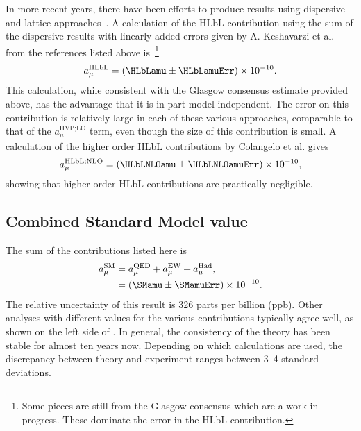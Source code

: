 In more recent years, there have been efforts to produce results using dispersive~\cite{PhysRevLett.121.112002,PhysRevD.95.054026,Hoferichter:2018kwz,Colangelo:2015ama,Colangelo:2017fiz,Colangelo:2017another,Colangelo:2019uex,Colangelo:2019lpu} and lattice approaches~\cite{Blum:2019ugy,Asmussen:2019act}. A calculation of the HLbL contribution using the sum of the dispersive results with linearly added errors given by A. Keshavarzi et al. from the references listed above is~\cite{Keshavarzi:2019abf}\footnote{Some pieces are still from the Glasgow consensus which are a work in progress. These dominate the error in the HLbL contribution.}
		\begin{align}
            a_{\mu}^{\text{HLbL}} = (\HLbLamu \pm \HLbLamuErr) \times 10^{-10}.
		\end{align}
This calculation, while consistent with the Glasgow consensus estimate provided above, has the advantage that it is in part model-independent. The error on this contribution is relatively large in each of these various approaches, comparable to that of the $a_{\mu}^{\text{HVP;LO}}$ term, even though the size of this contribution is small. A calculation of the higher order HLbL contributions by Colangelo et al. gives~\cite{Colangelo:2014qya}
		\begin{align}
            a_{\mu}^{\text{HLbL;NLO}} = (\HLbLNLOamu \pm \HLbLNLOamuErr) \times 10^{-10},
		\end{align}
showing that higher order HLbL contributions are practically negligible.





\subsection{Combined Standard Model value}

The sum of the \amu contributions listed here is~\cite{Kinoshita1,Kinoshita2,Ishikawa:2018rlv,Keshavarzi:2019abf,Kurz:2014wya,Nyffeler:2016gnb,Colangelo:2014qya}
		\begin{equation}
		\begin{aligned}
            a_{\mu}^{\text{SM}} &= a_{\mu}^{\text{QED}} + a_{\mu}^{\text{EW}} + a_{\mu}^{\text{Had}}, \\
			&= (\SMamu \pm \SMamuErr) \times 10^{-10}.
		\end{aligned}
		\end{equation}
The relative uncertainty of this result is 326 parts per billion (ppb). Other analyses with different values for the various contributions typically agree well, as shown on the left side of . In general, the consistency of the theory has been stable for almost ten years now. Depending on which calculations are used, the discrepancy between theory and experiment ranges between \SIrange{3}{4}{} standard deviations. 


